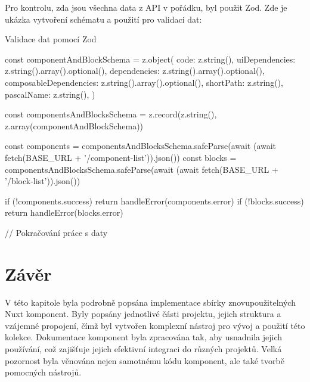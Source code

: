 \clearpage

Pro kontrolu, zda jsou všechna data z API v pořádku, byl použit Zod. Zde je ukázka vytvoření schématu a použití pro validaci dat:

\begin{listing}[H]
    \caption{Validace dat pomocí Zod}
    \label{lst:cli-install}
    \begin{code}
const componentAndBlockSchema = z.object({
  code: z.string(),
  uiDependencies: z.string().array().optional(),
  dependencies: z.string().array().optional(),
  composableDependencies: z.string().array().optional(),
  shortPath: z.string(),
  pascalName: z.string(),
})

const componentsAndBlocksSchema = z.record(z.string(), z.array(componentAndBlockSchema))

const components = componentsAndBlocksSchema.safeParse(await (await fetch(BASE_URL + '/component-list')).json())
const blocks = componentsAndBlocksSchema.safeParse(await (await fetch(BASE_URL + '/block-list')).json())

if (!components.success) {
    return handleError(components.error)
}
if (!blocks.success) {
    return handleError(blocks.error)
}

// Pokračování práce s daty
\end{code}
\end{listing}

\section{Závěr}
V této kapitole byla podrobně popsána implementace sbírky znovupoužitelných Nuxt komponent. Byly popsány jednotlivé části projektu, jejich struktura a vzájemné propojení, čímž byl vytvořen komplexní nástroj pro vývoj a použití této kolekce. Dokumentace komponent byla zpracována tak, aby usnadnila jejich používání, což zajišťuje jejich efektivní integraci do různých projektů. Velká pozornost byla věnována nejen samotnému kódu komponent, ale také tvorbě pomocných nástrojů.